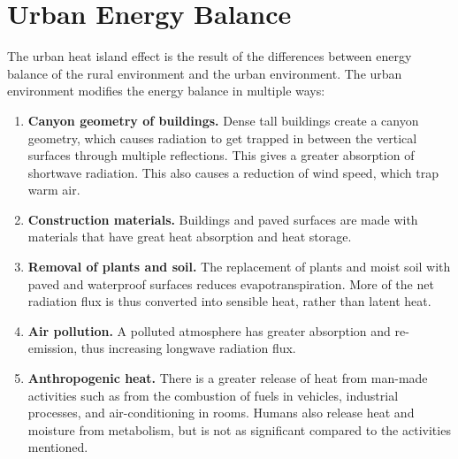 \section{Urban Energy Balance}
	The urban heat island effect is the result of the differences between energy balance of the rural environment and the urban environment.
	The urban environment modifies the energy balance in multiple ways:
	\begin{enumerate}
		\item \textbf{Canyon geometry of buildings.}
		Dense tall buildings create a canyon geometry,
			which causes radiation to get trapped in between the vertical surfaces through multiple reflections.
		This gives a greater absorption of shortwave radiation.
		This also causes a reduction of wind speed, which trap warm air.
		
		\item \textbf{Construction materials.}
		Buildings and paved surfaces are made with materials that have great heat absorption and heat storage.
		
		\item \textbf{Removal of plants and soil.}
		The replacement of plants and moist soil with paved and waterproof surfaces reduces evapotranspiration.
		More of the net radiation flux is thus converted into sensible heat, rather than latent heat.
		
		\item \textbf{Air pollution.}
		A polluted atmosphere has greater absorption and re-emission, thus increasing longwave radiation flux.
		
		\item \textbf{Anthropogenic heat.}
		There is a greater release of heat from man-made activities such as from
			the combustion of fuels in vehicles,
			industrial processes, and
			air-conditioning in rooms.
		Humans also release heat and moisture from metabolism, but is not as significant compared to the activities mentioned.
	\end{enumerate}

